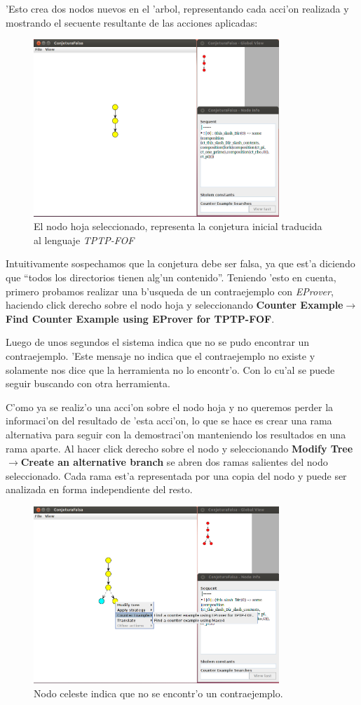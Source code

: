 'Esto crea dos nodos nuevos en el 'arbol, representando cada acci'on realizada y mostrando el secuente resultante de las acciones aplicadas:

\begin{figure}[H]
	\includegraphics[width=350px]{img/conjetura_falsa_2.png}
	\centering
	\caption{El nodo hoja seleccionado, representa la conjetura inicial traducida al lenguaje \textit{TPTP-FOF}}
\end{figure}

Intuitivamente sospechamos que la conjetura debe ser falsa, ya que est'a diciendo que ``todos los directorios tienen alg'un contenido''. Teniendo 'esto en cuenta, primero probamos realizar una b'usqueda de un contraejemplo con \textit{EProver}, haciendo click derecho sobre el nodo hoja y seleccionando \textbf{Counter Example$\rightarrow$Find Counter Example using EProver for TPTP-FOF}.

Luego de unos segundos el sistema indica que no se pudo encontrar un contraejemplo. 'Este mensaje no indica que el contraejemplo no existe y solamente nos dice que la herramienta no lo encontr'o. Con lo cu'al se puede seguir buscando con otra herramienta.

C'omo ya se realiz'o una acci'on sobre el nodo hoja y no queremos perder la informaci'on del resultado de 'esta acci'on, lo que se hace es crear una rama alternativa para seguir con la demostraci'on manteniendo los resultados en una rama aparte. Al hacer click derecho sobre el nodo y seleccionando \textbf{Modify Tree$\rightarrow$Create an alternative branch} se abren dos ramas salientes del nodo seleccionado. Cada rama est'a representada por una copia del nodo y puede ser analizada en forma independiente del resto.

\begin{figure}[H]
	\includegraphics[width=350px]{img/conjetura_falsa_3.png}
	\centering
	\caption{Nodo celeste indica que no se encontr'o un contraejemplo.}
\end{figure}

